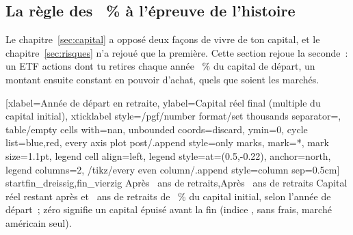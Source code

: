 \subsection{La r\`egle des \TauxRetrait~\% \`a l'\'epreuve de l'histoire}\label{sec:retraite-quatre}

Le chapitre~\ref{sec:capital} a oppos\'e deux fa\c{c}ons de vivre de ton capital, et le
chapitre~\ref{sec:risques} n'a rejou\'e que la premi\`ere. Cette section rejoue la seconde~: un ETF
actions dont tu retires chaque ann\'ee \TauxRetrait~\% du capital de d\'epart, un montant ensuite
constant en pouvoir d'achat, quels que soient les march\'es.


[xlabel={Ann\'ee de d\'epart en retraite},
  ylabel={Capital r\'eel final (multiple du capital initial)},
  xticklabel style={/pgf/number format/set thousands separator={}},
  table/empty cells with={nan}, unbounded coords=discard, ymin=0,
  cycle list={{blue},{red}}, every axis plot post/.append style={only marks, mark=*,
    mark size=1.1pt},
  legend cell align=left, legend style={at={(0.5,-0.22)}, anchor=north, legend columns=2,
    /tikz/every even column/.append style={column sep=0.5cm}}]%
  {start}{fin_dreissig,fin_vierzig}%
  {{Apr\`es \RetraitHistAnsDreissig~ans de retraits},{Apr\`es \RetraitHistAnsVierzig~ans de retraits}}%
  {Capital r\'eel restant apr\`es \RetraitHistAnsDreissig{} et \RetraitHistAnsVierzig~ans de retraits de
  \TauxRetrait~\% du capital initial, selon l'ann\'ee de d\'epart~; z\'ero signifie un capital
  \'epuis\'e avant la fin (indice \IndiceActionsUs, sans frais, march\'e am\'ericain
  seul).\label{fig:regle-retrait-histoire}}

